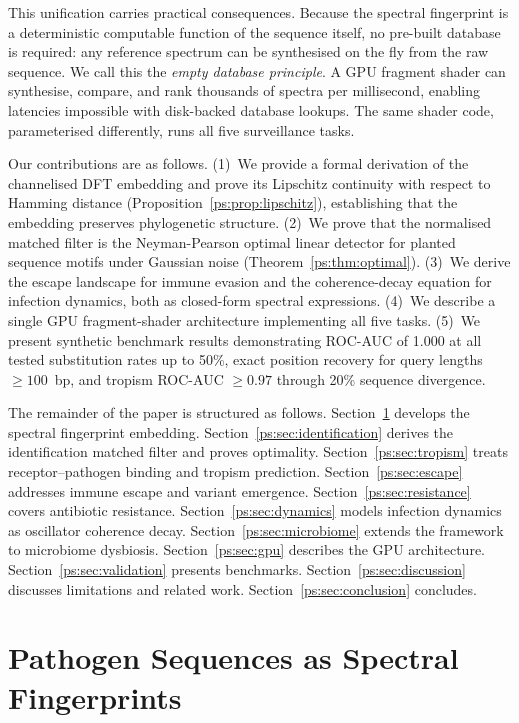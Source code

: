 This unification carries practical consequences. Because the spectral
fingerprint is a deterministic computable function of the sequence itself, no
pre-built database is required: any reference spectrum can be synthesised on the
fly from the raw sequence. We call this the \emph{empty database principle}. A
GPU fragment shader can synthesise, compare, and rank thousands of spectra per
millisecond, enabling latencies impossible with disk-backed database lookups.
The same shader code, parameterised differently, runs all five surveillance
tasks.

Our contributions are as follows. (1)~We provide a formal derivation of the
channelised DFT embedding and prove its Lipschitz continuity with respect to
Hamming distance (Proposition~\ref{ps:prop:lipschitz}), establishing that the
embedding preserves phylogenetic structure. (2)~We prove that the normalised
matched filter is the Neyman-Pearson optimal linear detector for planted sequence
motifs under Gaussian noise (Theorem~\ref{ps:thm:optimal}). (3)~We derive the
escape landscape for immune evasion and the coherence-decay equation for
infection dynamics, both as closed-form spectral expressions. (4)~We describe
a single GPU fragment-shader architecture implementing all five tasks.
(5)~We present synthetic benchmark results demonstrating ROC-AUC of 1.000 at
all tested substitution rates up to 50\%, exact position recovery for query
lengths $\geq 100$~bp, and tropism ROC-AUC $\geq 0.97$ through 20\% sequence
divergence.

The remainder of the paper is structured as follows.
Section~\ref{ps:sec:fingerprint} develops the spectral fingerprint embedding.
Section~\ref{ps:sec:identification} derives the identification matched filter and
proves optimality. Section~\ref{ps:sec:tropism} treats receptor--pathogen binding
and tropism prediction. Section~\ref{ps:sec:escape} addresses immune escape and
variant emergence. Section~\ref{ps:sec:resistance} covers antibiotic resistance.
Section~\ref{ps:sec:dynamics} models infection dynamics as oscillator coherence
decay. Section~\ref{ps:sec:microbiome} extends the framework to microbiome
dysbiosis. Section~\ref{ps:sec:gpu} describes the GPU architecture.
Section~\ref{ps:sec:validation} presents benchmarks. Section~\ref{ps:sec:discussion}
discusses limitations and related work. Section~\ref{ps:sec:conclusion} concludes.

\section{Pathogen Sequences as Spectral Fingerprints}
\label{ps:sec:fingerprint}

